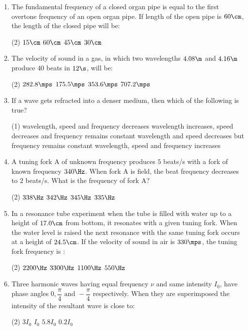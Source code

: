 \documentclass{article}
\begin{document}
\begin{enumerate}
\item  The fundamental frequency of a closed organ pipe is equal to the first overtone frequency of an open organ pipe. If length of the open pipe is $60\cm$, the length of the closed pipe will be:
	\begin{tasks}(2)
		\task $15\cm$\ans
		\task $60\cm$
		\task $45\cm$
		\task $30\cm$
	\end{tasks}

\item The velocity of sound in a gas, in which two wavelengths $4.08\m$ and $4.16\m$ produce $40$ beats in $12\s$, will be:
	\begin{tasks}(2)
		\task $282.8\mps$
		\task $175.5\mps$
		\task $353.6\mps$
		\task $707.2\mps$\ans
	\end{tasks}

\item If a wave gets refracted into a denser medium, then which of the following is true?
	\begin{tasks}(1)
		\task wavelength, speed and frequency decreases
		\task wavelength increases, speed decreases and frequency remains constant
		\task wavelength and speed decreases but frequency remains constant\ans
		\task wavelength, speed and frequency increases
	\end{tasks}

\item A tuning fork A of unknown frequency produces $5$ beats/s with a fork of known frequency $340 \Hz$. When fork A is field, the beat frequency decreases to $2$ beats/s. What is the frequency of fork A?
	\begin{tasks}(2)
		\task $338\Hz$
		\task $342\Hz$
		\task $345\Hz$
		\task $335\Hz$\ans
	\end{tasks}

\item In a resonance tube experiment when the tube is filled with water up to a height of $17.0 \cm$ from bottom, it resonates with a given tuning fork. When the water level is raised the next resonance with the same tuning fork occurs at a height of $24.5 \cm$. If the velocity of sound in air is $330 \mps$, the tuning fork frequency is :
	\begin{tasks}(2)
		\task $2200\Hz$\ans
		\task $3300\Hz$
		\task $1100\Hz$
		\task $550\Hz$
	\end{tasks}

\item Three harmonic waves having equal frequency $\nu$ and same intensity $I_0$, have phase angles $0, \dfrac{\pi}{4} \text{ and } -\dfrac{\pi}{4}$ respectively. When they are superimposed the intensity of the resultant wave is close to:
	\begin{tasks}(2)
		\task $3I_0$
		\task $I_0$
		\task $5.8I_0$\ans
		\task $0.2I_0$
	\end{tasks}


\end{enumerate}
\end{document}
